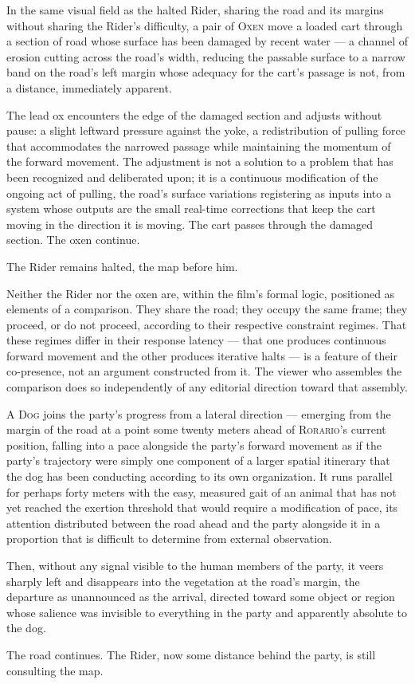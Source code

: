 \documentclass[12pt, oneside]{article}
\newenvironment{action}{%
  \vspace{0.6em}%
  \noindent\ignorespaces%
}{%
  \par\vspace{0.6em}%
}
\begin{document}
\begin{action}
In the same visual field as the halted Rider, sharing the road and its margins without sharing the Rider's difficulty, a pair of \textsc{Oxen} move a loaded cart through a section of road whose surface has been damaged by recent water --- a channel of erosion cutting across the road's width, reducing the passable surface to a narrow band on the road's left margin whose adequacy for the cart's passage is not, from a distance, immediately apparent.

The lead ox encounters the edge of the damaged section and adjusts without pause: a slight leftward pressure against the yoke, a redistribution of pulling force that accommodates the narrowed passage while maintaining the momentum of the forward movement. The adjustment is not a solution to a problem that has been recognized and deliberated upon; it is a continuous modification of the ongoing act of pulling, the road's surface variations registering as inputs into a system whose outputs are the small real-time corrections that keep the cart moving in the direction it is moving. The cart passes through the damaged section. The oxen continue.

The Rider remains halted, the map before him.

Neither the Rider nor the oxen are, within the film's formal logic, positioned as elements of a comparison. They share the road; they occupy the same frame; they proceed, or do not proceed, according to their respective constraint regimes. That these regimes differ in their response latency --- that one produces continuous forward movement and the other produces iterative halts --- is a feature of their co-presence, not an argument constructed from it. The viewer who assembles the comparison does so independently of any editorial direction toward that assembly.
\end{action}

\begin{action}
A \textsc{Dog} joins the party's progress from a lateral direction --- emerging from the margin of the road at a point some twenty meters ahead of \textsc{Rorario}'s current position, falling into a pace alongside the party's forward movement as if the party's trajectory were simply one component of a larger spatial itinerary that the dog has been conducting according to its own organization. It runs parallel for perhaps forty meters with the easy, measured gait of an animal that has not yet reached the exertion threshold that would require a modification of pace, its attention distributed between the road ahead and the party alongside it in a proportion that is difficult to determine from external observation.

Then, without any signal visible to the human members of the party, it veers sharply left and disappears into the vegetation at the road's margin, the departure as unannounced as the arrival, directed toward some object or region whose salience was invisible to everything in the party and apparently absolute to the dog.

The road continues. The Rider, now some distance behind the party, is still consulting the map.
\end{action}
\end{document}
